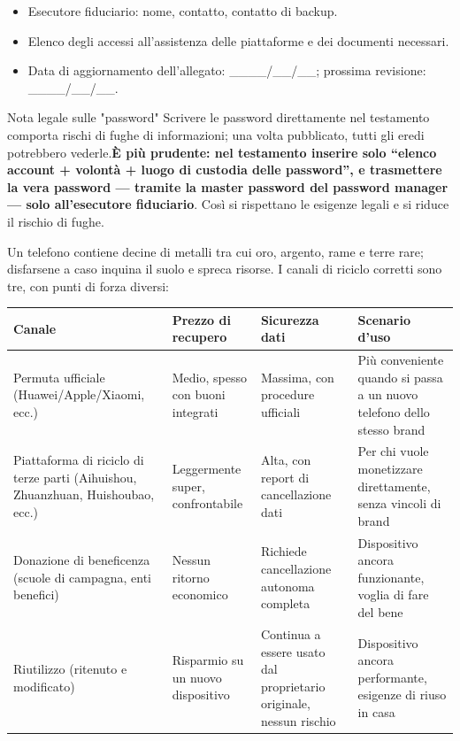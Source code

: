 \begin{itemize}
  \item Esecutore fiduciario: nome, contatto, contatto di backup.
  \item Elenco degli accessi all'assistenza delle piattaforme e dei documenti necessari.
  \item Data di aggiornamento dell'allegato: \_\_\_\_/\_\_/\_\_; prossima revisione: \_\_\_\_/\_\_/\_\_.
\end{itemize}

\begin{tcbwarn}{Nota legale sulle "password"}
Scrivere le password direttamente nel testamento comporta rischi di fughe di informazioni; una volta pubblicato, tutti gli eredi potrebbero vederle.\textbf{È più prudente: nel testamento inserire solo “elenco account + volontà + luogo di custodia delle password”, e trasmettere la vera password — tramite la master password del password manager — solo all'esecutore fiduciario}. Così si rispettano le esigenze legali e si riduce il rischio di fughe.

\end{tcbwarn}


Un telefono contiene decine di metalli tra cui oro, argento, rame e terre rare; disfarsene a caso inquina il suolo e spreca risorse. I canali di riciclo corretti sono tre, con punti di forza diversi:

\begin{center}
\begin{tabularx}{\linewidth}{|X|X|X|X|}
\hline
\textbf{Canale} & \textbf{Prezzo di recupero} & \textbf{Sicurezza dati} & \textbf{Scenario d'uso} \tabularnewline
\hline
Permuta ufficiale (Huawei/Apple/Xiaomi, ecc.) & Medio, spesso con buoni integrati & Massima, con procedure ufficiali & Più conveniente quando si passa a un nuovo telefono dello stesso brand \tabularnewline
Piattaforma di riciclo di terze parti (Aihuishou, Zhuanzhuan, Huishoubao, ecc.) & Leggermente super, confrontabile & Alta, con report di cancellazione dati & Per chi vuole monetizzare direttamente, senza vincoli di brand \tabularnewline
Donazione di beneficenza (scuole di campagna, enti benefici) & Nessun ritorno economico & Richiede cancellazione autonoma completa & Dispositivo ancora funzionante, voglia di fare del bene \tabularnewline
Riutilizzo (ritenuto e modificato) & Risparmio su un nuovo dispositivo & Continua a essere usato dal proprietario originale, nessun rischio & Dispositivo ancora performante, esigenze di riuso in casa \tabularnewline
\hline
\end{tabularx}
\end{center}


